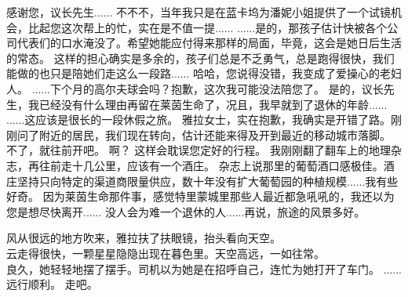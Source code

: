 \documentclass[openany]{book}
\begin{document}
\begin{dialogue}
     感谢您，议长先生......
     不不不，当年我只是在蓝卡坞为潘妮小姐提供了一个试镜机会，比起您这次帮上的忙，实在是不值一提......
     ......是的，那孩子估计快被各个公司代表们的口水淹没了。希望她能应付得来那样的局面，毕竟，这会是她日后生活的常态。
     这样的担心确实是多余的，孩子们总是不乏勇气，总是跑得很快，我们能做的也只是陪她们走这么一段路......
     哈哈，您说得没错，我变成了爱操心的老妇人。
     ......下个月的高尔夫球会吗？抱歉，这次我可能没法陪您了。
     是的，议长先生，我已经没有什么理由再留在莱茵生命了，况且，我早就到了退休的年龄......
     ......这应该是很长的一段休假之旅。
     雅拉女士，实在抱歉，我确实是开错了路。刚刚问了附近的居民，我们现在转向，估计还能来得及开到最近的移动城市落脚。
     不了，就往前开吧。
     啊？
     这样会耽误您定好的行程。
     我刚刚翻了翻车上的地理杂志，再往前走十几公里，应该有一个酒庄。
     杂志上说那里的葡萄酒口感极佳。酒庄坚持只向特定的渠道商限量供应，数十年没有扩大葡萄园的种植规模......我有些好奇。
     因为莱茵生命那件事，感觉特里蒙城里那些人最近都急吼吼的，我还以为您是想尽快离开......
     没人会为难一个退休的人......再说，旅途的风景多好。\par
    风从很远的地方吹来，雅拉扶了扶眼镜，抬头看向天空。\\
    云走得很快，一颗星星隐隐出现在暮色里。天空高远，一如往常。\\
    良久，她轻轻地摆了摆手。司机以为她是在招呼自己，连忙为她打开了车门。
     ......远行顺利。
     走吧。
\end{dialogue}
\end{document}
